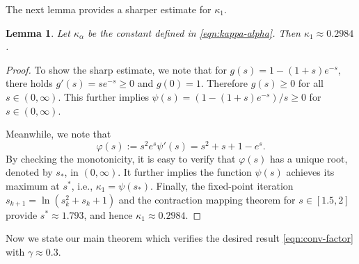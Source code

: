 \documentclass[a4paper, oneside]{book}
\newtheorem{lemma}{Lemma}[section]
\newtheorem{theorem}{Theorem}[section]
\begin{document}
The next lemma provides a sharper estimate for $\kappa_1$.

\begin{lemma}\label{lem:exp-1}
Let $\kappa_\alpha$ be the constant defined in \eqref{eqn:kappa-alpha}. Then $\kappa_1\approx 0.2984$.
\end{lemma}

\begin{proof}
To show the sharp estimate, we note that for $g(s) = 1-(1+s)e^{- s}$, there holds
$g'(s) = se^{-s} \ge 0$ and $g(0) = 1$. Therefore $g(s)\ge0$ for all $s\in(0,\infty)$.
This further implies $\psi(s)=(1-(1+s)e^{- s})/s \ge 0$ for $s\in (0,\infty)$.

Meanwhile, we note that
$$\varphi(s) := s^2 e^s \psi'(s) =  s^2 +s+1 -e^s. $$
{By checking the monotonicity, it is easy to verify that $\varphi(s)$ has a unique root, denoted by $s_*$, in $(0,\infty)$.
It further implies the function $\psi(s)$ achieves its maximum at $s^*$, i.e., $\kappa_1 = \psi(s_*)$.
Finally, the fixed-point iteration $s_{k+1} = \ln(s_k^2+s_k+1)$ and the contraction mapping theorem for $s\in[1.5,2]$ provide $s^*\approx1.793$, and hence $\kappa_1\approx 0.2984$.}
\end{proof}



Now we state our main theorem which verifies the desired result \eqref{eqn:conv-factor} with $\gamma\approx 0.3$.







\end{document}
